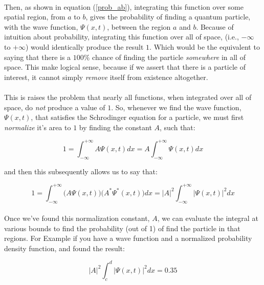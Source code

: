 \documentclass[12pt,letterpaper]{book}
\begin{document}
\paragraph*{}Then, as shown in equation (\ref{prob_ab}), integrating this function over some spatial region, from $a$ to $b$, gives the probability of finding a quantum particle, with the wave function, $\Psi(x,t)$, between the region $a$ and $b$. Because of intuition about probability, integrating this function over all of space, (i.e., $-\infty$ to $+\infty$) would identically produce the result $1$. Which would be the equivalent to saying that there is a $100\%$ chance of finding the particle \textit{somewhere} in all of space. This make logical sense, because if we assert that there is a particle of interest, it cannot simply \textit{remove} itself from existence altogether.

\paragraph*{}This is raises the problem that nearly all functions, when integrated over all of space, do \textit{not} produce a value of $1$. So, whenever we find the wave function, $\Psi(x,t)$, that satisfies the Schrodinger equation for a particle, we must first \textit{normalize} it's area to $1$ by finding the constant $A$, such that:

\begin{equation}
\label{normalize wave function}
1 = \int_{-\infty}^{+\infty} A \Psi(x,t) dx = A\int_{-\infty}^{+\infty} \Psi(x,t) dx
\end{equation}

and then this subsequently allows us to say that:

\begin{equation}
1 = \int_{-\infty}^{+\infty} \Big(A \Psi(x,t)\Big) \Big(A^* \Psi^*(x,t)\Big) dx = 
|A|^2 \int_{-\infty}^{+\infty} \Big| \Psi(x,t) \Big|^2 dx
\end{equation}

\paragraph*{}Once we've found this normalization constant, $A$, we can evaluate the integral at various bounds to find the probability (out of 1) of find the particle in that regions. For Example if you have a wave function and a normalized probability density function, and found the result:

\begin{equation}
|A|^2\int_{c}^{d} \big | \Psi(x,t) \big|^2 dx = 0.35
\end{equation}
\end{document}
